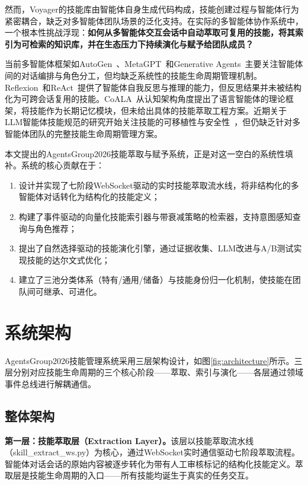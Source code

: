 \documentclass[conference]{IEEEtran}
\begin{document}
然而，Voyager的技能库由智能体自身生成代码构成，技能创建过程与智能体行为紧密耦合，缺乏对多智能体团队场景的泛化支持。在实际的多智能体协作系统中，一个根本性挑战浮现：\textbf{如何从多智能体交互会话中自动萃取可复用的技能，将其索引为可检索的知识库，并在生态压力下持续演化与赋予给团队成员？}

当前多智能体框架如AutoGen~\cite{wu2023autogen}、MetaGPT~\cite{hong2023metagpt}和Generative Agents~\cite{park2023generative}主要关注智能体间的对话编排与角色分工，但均缺乏系统性的技能生命周期管理机制。Reflexion~\cite{shinn2023reflexion}和ReAct~\cite{yao2022react}提供了智能体自我反思与推理的能力，但反思结果并未被结构化为可跨会话复用的技能。CoALA~\cite{sumers2023coala}从认知架构角度提出了语言智能体的理论框架，将技能作为长期记忆模块，但未给出具体的技能萃取工程方案。近期关于LLM智能体技能规范的研究开始关注技能的可移植性与安全性~\cite{skcc2025,skill_pseudocode2025,skill_comprehension2025}，但仍缺乏针对多智能体团队的完整技能生命周期管理方案。

本文提出的AgentsGroup2026技能萃取与赋予系统，正是对这一空白的系统性填补。系统的核心贡献在于：

\begin{enumerate}[nosep]
\item 设计并实现了七阶段WebSocket驱动的实时技能萃取流水线，将非结构化的多智能体对话转化为结构化的技能定义；
\item 构建了事件驱动的向量化技能索引器与带衰减策略的检索器，支持意图感知查询与角色推荐；
\item 提出了自然选择驱动的技能演化引擎，通过证据收集、LLM改进与A/B测试实现技能的达尔文式优化；
\item 建立了三池分类体系（特有/通用/储备）与技能身份归一化机制，使技能在团队间可继承、可进化。
\end{enumerate}

\section{系统架构}

AgentsGroup2026技能管理系统采用三层架构设计，如图\ref{fig:architecture}所示。三层分别对应技能生命周期的三个核心阶段——萃取、索引与演化——各层通过领域事件总线进行解耦通信。

\subsection{整体架构}

\textbf{第一层：技能萃取层（Extraction Layer）。}该层以技能萃取流水线（skill\_extract\_ws.py）为核心，通过WebSocket实时通信驱动七阶段萃取流程。智能体对话会话的原始内容被逐步转化为带有人工审核标记的结构化技能定义。萃取层是技能生命周期的入口——所有技能均诞生于真实的任务交互。
\end{document}

